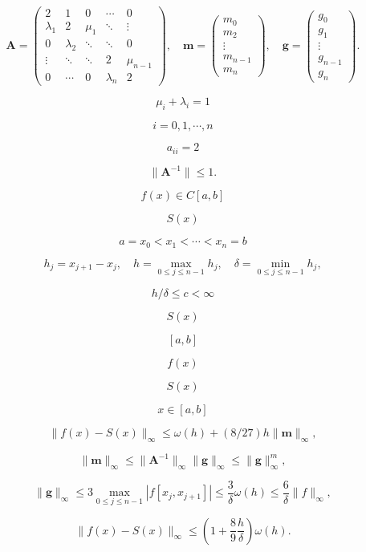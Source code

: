 \documentclass[fontset=fandol]{ctexart}
\begin{document}
\[\boldsymbol A=\begin{pmatrix}
2&1&0&\cdots&0\\
\lambda_1&2&\mu_1&\ddots&\vdots\\
0&\lambda_2&\ddots&\ddots&0\\
\vdots&\ddots&\ddots&2&\mu_{n-1}\\
0&\cdots&0&\lambda_n&2
\end{pmatrix},\quad
\boldsymbol m=\begin{pmatrix}m_0\\m_2\\\vdots\\m_{n-1}\\m_n\end{pmatrix},\quad
\boldsymbol g=\begin{pmatrix}g_0\\g_1\\\vdots\\g_{n-1}\\g_n\end{pmatrix}.\]

\[\mu_i+\lambda_i=1\]

\[i=0,1,\cdots,n\]

\[a_{ii}=2\]

\[\|\boldsymbol A^{-1}\|\leqslant1.\tag{2.8.25}\]

\[f(x)\in C[a,b]\]

\[S(x)\]

\[a=x_0<x_1<\cdots<x_n=b\]

\[h_j=x_{j+1}-x_j,\quad h=\max_{0\leqslant j\leqslant n-1}h_j,\quad\delta=\min_{0\leqslant j\leqslant n-1}h_j,\]

\[h/\delta\leqslant c<\infty\]

\[S(x)\]

\[[a,b]\]

\[f(x)\]

\[S(x)\]

\[x\in[a,b]\]

\[\|f(x)-S(x)\|_\infty\leqslant\omega(h)+(8/27)h\|\boldsymbol m\|_\infty,\tag{2.8.26}\]

\[\|\boldsymbol m\|_\infty\leqslant\|\boldsymbol A^{-1}\|_\infty\|\boldsymbol g\|_\infty\leqslant\|\boldsymbol g\|_\infty^m,\tag{2.8.27}\]

\[\|\boldsymbol g\|_\infty\leqslant3\max_{0\leqslant j\leqslant n-1}|f[x_j,x_{j+1}]|\leqslant\frac3\delta\omega(h)\leqslant\frac6\delta\|f\|_\infty,\tag{2.8.28}\]

\[\|f(x)-S(x)\|_\infty\leqslant\left(1+\frac89\frac h\delta\right)\omega(h).\]
\end{document}
